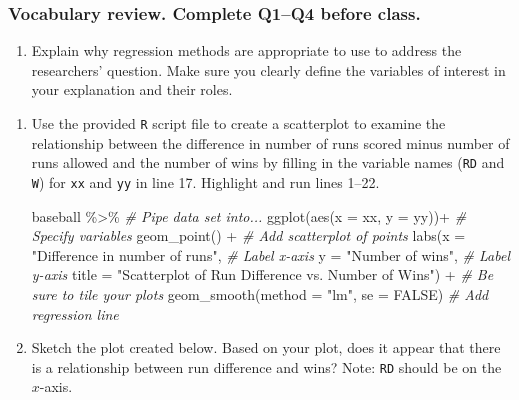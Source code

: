 \documentclass[
]{report}
\newenvironment{Shaded}{\begin{snugshade}}{\end{snugshade}}
\newcommand{\AttributeTok}[1]{\textcolor[rgb]{0.77,0.63,0.00}{#1}}
\newcommand{\CommentTok}[1]{\textcolor[rgb]{0.56,0.35,0.01}{\textit{#1}}}
\newcommand{\ConstantTok}[1]{\textcolor[rgb]{0.00,0.00,0.00}{#1}}
\newcommand{\FunctionTok}[1]{\textcolor[rgb]{0.00,0.00,0.00}{#1}}
\newcommand{\NormalTok}[1]{#1}
\newcommand{\SpecialCharTok}[1]{\textcolor[rgb]{0.00,0.00,0.00}{#1}}
\newcommand{\StringTok}[1]{\textcolor[rgb]{0.31,0.60,0.02}{#1}}
\providecommand{\tightlist}{%
  \setlength{\itemsep}{0pt}\setlength{\parskip}{0pt}}
\begin{document}
\hypertarget{vocabulary-review.-complete-q1q4-before-class.-1}{%
\subsubsection*{Vocabulary review. Complete Q1--Q4 before class.}\label{vocabulary-review.-complete-q1q4-before-class.-1}}

\begin{enumerate}
\def\labelenumi{\arabic{enumi}.}
\tightlist
\item
  Explain why regression methods are appropriate to use to address the researchers' question. Make sure you clearly define the variables of interest in your explanation and their roles.
\end{enumerate}

\vspace{.5in}

\begin{enumerate}
\def\labelenumi{\arabic{enumi}.}
\setcounter{enumi}{1}
\item
  Use the provided \texttt{R} script file to create a scatterplot to examine the relationship between the difference in number of runs scored minus number of runs allowed and the number of wins by filling in the variable names (\texttt{RD} and \texttt{W}) for \texttt{xx} and \texttt{yy} in line 17. Highlight and run lines 1--22.

\begin{Shaded}
\begin{Highlighting}[]
\NormalTok{baseball }\SpecialCharTok{\%\textgreater{}\%} \CommentTok{\# Pipe data set into...}
\FunctionTok{ggplot}\NormalTok{(}\FunctionTok{aes}\NormalTok{(}\AttributeTok{x =}\NormalTok{ xx, }\AttributeTok{y =}\NormalTok{ yy))}\SpecialCharTok{+}  \CommentTok{\# Specify variables}
  \FunctionTok{geom\_point}\NormalTok{() }\SpecialCharTok{+}  \CommentTok{\# Add scatterplot of points}
  \FunctionTok{labs}\NormalTok{(}\AttributeTok{x =} \StringTok{"Difference in number of runs"}\NormalTok{,  }\CommentTok{\# Label x{-}axis}
       \AttributeTok{y =} \StringTok{"Number of wins"}\NormalTok{,  }\CommentTok{\# Label y{-}axis}
       \AttributeTok{title =} \StringTok{"Scatterplot of Run Difference vs. Number of Wins"}\NormalTok{) }\SpecialCharTok{+} 
               \CommentTok{\# Be sure to tile your plots}
  \FunctionTok{geom\_smooth}\NormalTok{(}\AttributeTok{method =} \StringTok{"lm"}\NormalTok{, }\AttributeTok{se =} \ConstantTok{FALSE}\NormalTok{)  }\CommentTok{\# Add regression line}
\end{Highlighting}
\end{Shaded}
\item
  Sketch the plot created below. Based on your plot, does it appear that there is a relationship between run difference and wins? Note: \texttt{RD} should be on the \(x\)-axis.
\end{enumerate}
\end{document}
